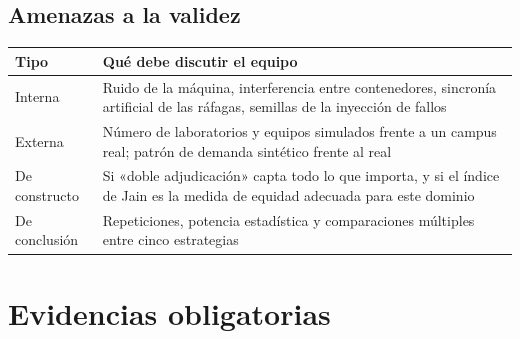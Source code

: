 \documentclass[11pt,a4paper]{article}
\begin{document}
\subsection{Amenazas a la validez}

\begin{center}
	\small
	\begin{tabular}{@{}p{3.2cm}p{11.8cm}@{}}
		\toprule
		\textbf{Tipo} & \textbf{Qué debe discutir el equipo} \\
		\midrule
		Interna & Ruido de la máquina, interferencia entre contenedores, sincronía artificial de las ráfagas, semillas de la inyección de fallos \\
		\addlinespace
		Externa & Número de laboratorios y equipos simulados frente a un campus real; patrón de demanda sintético frente al real \\
		\addlinespace
		De constructo & Si «doble adjudicación» capta todo lo que importa, y si el índice de Jain es la medida de equidad adecuada para este dominio \\
		\addlinespace
		De conclusión & Repeticiones, potencia estadística y comparaciones múltiples entre cinco estrategias \\
		\bottomrule
	\end{tabular}
\end{center}

\section{Evidencias obligatorias}
\end{document}

